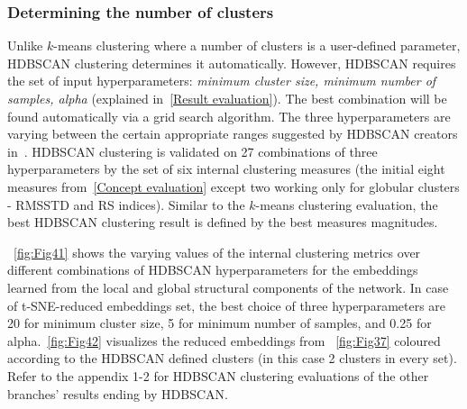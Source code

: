 \subsubsection{Determining the number of clusters}
Unlike $k$-means clustering where a number of clusters is a user-defined parameter, HDBSCAN clustering determines it automatically. However, HDBSCAN requires the set of input hyperparameters: \textit{minimum cluster size, minimum number of samples, alpha} (explained in~\ref{Result evaluation}). The best combination will be found automatically via a grid search algorithm. The three hyperparameters are varying between the certain appropriate ranges suggested by HDBSCAN creators in~\cite{mcinnes2017hdbscan}. HDBSCAN clustering is validated on 27 combinations of three hyperparameters by the set of six internal clustering measures (the initial eight measures from~\ref{Concept evaluation} except two working only for globular clusters - RMSSTD and RS indices). Similar to the $k$-means clustering evaluation, the best HDBSCAN clustering result is defined by the best measures magnitudes.

~\autoref{fig:Fig41} shows the varying values of the internal clustering metrics over different combinations of HDBSCAN hyperparameters for the embeddings learned from the local and global structural components of the network. In case of t-SNE-reduced embeddings set, the best choice of three hyperparameters are 20 for minimum cluster size, 5 for minimum number of samples, and 0.25 for alpha.~\autoref{fig:Fig42} visualizes the reduced embeddings from ~\autoref{fig:Fig37} coloured according to the HDBSCAN defined clusters (in this case 2 clusters in every set). Refer to the appendix 1-2 for HDBSCAN clustering evaluations of the other branches' results ending by HDBSCAN.

